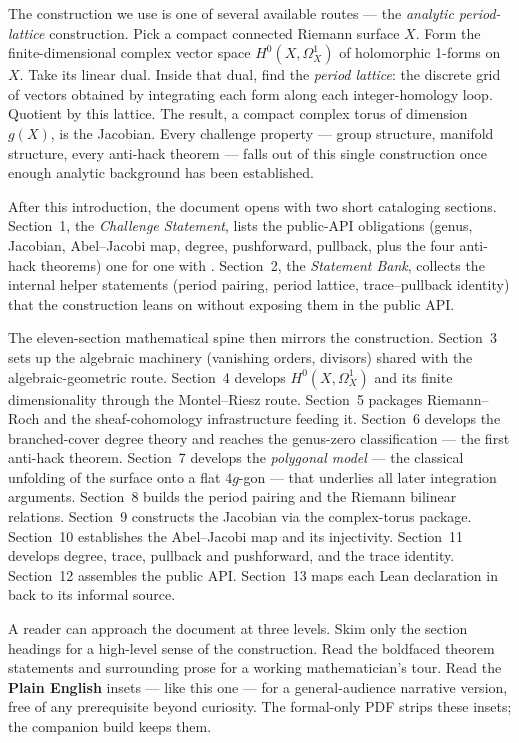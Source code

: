 \begin{layman}
The construction we use is one of several available routes --- the
\emph{analytic period-lattice} construction. Pick a compact connected
Riemann surface \(X\). Form the finite-dimensional complex vector
space \(H^0(X,\Omega^1_X)\) of holomorphic 1-forms on \(X\). Take its
linear dual. Inside that dual, find the \emph{period lattice}: the
discrete grid of vectors obtained by integrating each form along
each integer-homology loop. Quotient by this lattice. The result, a
compact complex torus of dimension \(g(X)\), is the Jacobian. Every
challenge property --- group structure, manifold structure, every
anti-hack theorem --- falls out of this single construction once
enough analytic background has been established.

After this introduction, the document opens with two short cataloging
sections. Section~1, the \emph{Challenge Statement}, lists the
public-API obligations (genus, Jacobian, Abel--Jacobi map, degree,
pushforward, pullback, plus the four anti-hack theorems) one for one
with . Section~2, the \emph{Statement
Bank}, collects the internal helper statements (period pairing, period
lattice, trace--pullback identity) that the construction leans on
without exposing them in the public API.

The eleven-section mathematical spine then mirrors the construction.
Section~3 sets up the algebraic machinery (vanishing orders,
divisors) shared with the algebraic-geometric route. Section~4
develops \(H^0(X,\Omega^1_X)\) and its finite dimensionality
through the Montel--Riesz route. Section~5 packages
Riemann--Roch and the sheaf-cohomology infrastructure feeding it.
Section~6 develops the branched-cover degree theory and reaches
the genus-zero classification --- the first anti-hack theorem.
Section~7 develops the \emph{polygonal model} --- the classical
unfolding of the surface onto a flat \(4g\)-gon --- that underlies
all later integration arguments. Section~8 builds the period
pairing and the Riemann bilinear relations. Section~9 constructs
the Jacobian via the complex-torus package. Section~10 establishes
the Abel--Jacobi map and its injectivity. Section~11 develops
degree, trace, pullback and pushforward, and the trace identity.
Section~12 assembles the public API. Section~13 maps each Lean
declaration in  back to its informal source.

A reader can approach the document at three levels. Skim only the
section headings for a high-level sense of the construction. Read
the boldfaced theorem statements and surrounding prose for a
working mathematician's tour. Read the \textbf{Plain English}
insets --- like this one --- for a general-audience narrative version,
free of any prerequisite beyond curiosity. The formal-only PDF
strips these insets; the companion build keeps them.
\end{layman}

